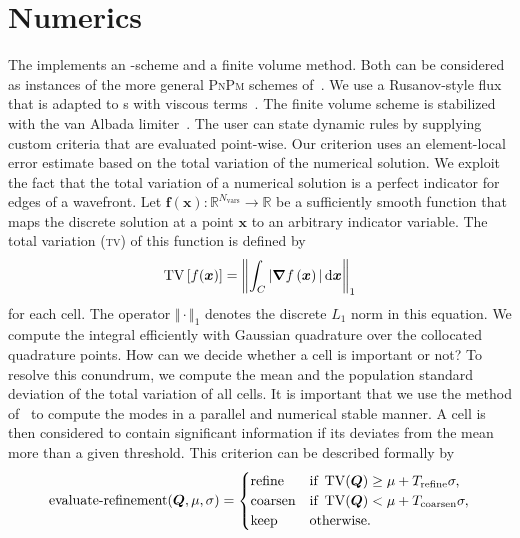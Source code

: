 \documentclass[runningheads]{llncs}
\begin{document}
\section{Numerics}
The \exahypeengine{} implements an \aderdg{}-scheme and a \muscl{} finite volume method.
Both can be considered as instances of the more general \textsc{PnPm} schemes of~\cite{dumbser2008unified}.
We use a Rusanov-style flux that is adapted to \pde{}s with viscous terms~\cite{gassner2008discontinuous,fambri2017space}.
The finite volume scheme is stabilized with the van Albada limiter~\cite{van1997comparative}.
The user can state dynamic \amr{} rules by supplying custom criteria that are evaluated point-wise.
Our criterion uses an element-local error estimate based on the total variation of the numerical solution.
We exploit the fact that the total variation of a numerical solution is a perfect indicator for edges of a wavefront.
Let $\bm{f}(\bm{x}): \mathbb{R}^{N_\text{vars}} \to \mathbb{R}$ be a sufficiently smooth function that maps the discrete solution at a point $\bm{x}$ to an arbitrary indicator variable.
The total variation (\textsc{tv}) of this function is defined by
\begin{equation}
  \label{eq:tv}
  \tv \left[ f(\bm{x}) \right] =
  \left\Vert
\intdcell{ \vert \gradient{f \left( \bm{x} \right)} \vert }
\right\Vert_1
\end{equation}
for each cell.
The operator $\Vert \cdot \Vert_1$ denotes the discrete $L_1$ norm in this equation.
We compute the integral efficiently with Gaussian quadrature over the collocated quadrature points.
\newcommand{\mean}{\mu}%
\newcommand{\std}{\sigma}%
\newcommand{\variance}{\std^2}%
\newcommand{\Trefine}{T_\text{refine}}%
\newcommand{\Tdelete}{T_\text{coarsen}}%
How can we decide whether a cell is important or not?
To resolve this conundrum, we compute the mean and the population standard deviation of the total variation of all cells.
It is important that we use the method of~\cite{chan1982updating} to compute the modes in a parallel and numerical stable manner.
A cell is then considered to contain significant information if its deviates from the mean more than a given threshold.
This criterion can be described formally by
\begin{equation}
  \label{eq:refinement-criterion}
  \operatorname{evaluate-refinement}(\Q, \mu, \sigma) =
  \begin{cases}
    \text{refine} & \text{if } \tv(\Q) \geq \mu + \Trefine \sigma, \\
    \text{coarsen} & \text{if } \tv(\Q) < \mu + \Tdelete \sigma, \\
    \text{keep} & \text{otherwise}.
    \end{cases}
\end{equation}
\end{document}
